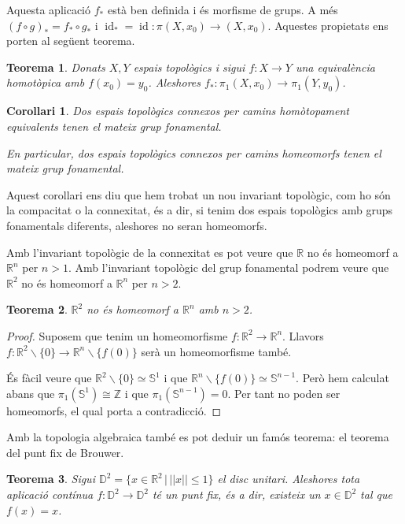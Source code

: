 \documentclass{article}
\newtheorem{teorema}{Teorema}
\newtheorem{corollari}{Corol\textperiodcentered lari}
\theoremstyle{definition}
\DeclareMathOperator{\id}{id}
\begin{document}
Aquesta aplicaci\'{o} $f_*$ est\`{a} ben definida i \'{e}s morfisme de grups. A m\'{e}s $(f\circ g)_*=f_*\circ g_*$ i $\id_*=\id:\pi(X,x_0)\rightarrow(X,x_0)$. Aquestes propietats ens porten al seg\"{u}ent teorema.

\begin{teorema}
Donats $X,Y$ espais topol\`{o}gics i sigui $f:X\rightarrow Y$ una equival\`{e}ncia homot\`{o}pica amb $f(x_0)=y_0$. Aleshores $f_*:\pi_1(X,x_0)\rightarrow\pi_1(Y,y_0)$.
\end{teorema}

\begin{corollari}
Dos espais topol\`{o}gics connexos per camins hom\`{o}topament equivalents tenen el mateix grup fonamental.

En particular, dos espais topol\`{o}gics connexos per camins homeomorfs tenen el mateix grup fonamental.
\end{corollari}

Aquest corol\textperiodcentered lari ens diu que hem trobat un nou invariant topol\`{o}gic, com ho s\'{o}n la compacitat o la connexitat, \'{e}s a dir, si tenim dos espais topol\`{o}gics amb grups fonamentals diferents, aleshores no seran homeomorfs.

Amb l'invariant topol\`{o}gic de la connexitat es pot veure que $\mathbb{R}$ no \'{e}s homeomorf a $\mathbb{R}^n$ per $n>1$. Amb l'invariant topol\`{o}gic del grup fonamental podrem veure que $\mathbb{R}^2$ no \'{e}s homeomorf a $\mathbb{R}^n$ per $n>2$.

\begin{teorema}
$\mathbb{R}^2$ no \'{e}s homeomorf a $\mathbb{R}^n$ amb $n>2$.
\end{teorema}
\begin{proof}
Suposem que tenim un homeomorfisme $f:\mathbb{R}^2\rightarrow\mathbb{R}^n$. Llavors $f:\mathbb{R}^2\backslash\{0\}\rightarrow\mathbb{R}^n\backslash\{f(0)\}$ ser\`{a} un homeomorfisme tamb\'{e}.

\'{E}s f\`{a}cil veure que $\mathbb{R}^2\backslash\{0\}\simeq\mathbb{S}^1$ i que $\mathbb{R}^n\backslash\{f(0)\}\simeq\mathbb{S}^{n-1}$. Per\`{o} hem calculat abans que $\pi_1(\mathbb{S}^1)\cong\mathbb{Z}$ i que $\pi_1(\mathbb{S}^{n-1})=0$. Per tant no poden ser homeomorfs, el qual porta a contradicci\'{o}.
\end{proof}

Amb la topologia algebraica tamb\'{e} es pot deduir un fam\'{o}s teorema: el teorema del punt fix de Brouwer.

\begin{teorema}
Sigui $\mathbb{D}^2=\{x\in\mathbb{R}^2\,|\,||x||\leq1\}$ el disc unitari. Aleshores tota aplicaci\'{o} cont\'{i}nua $f:\mathbb{D}^2\rightarrow\mathbb{D}^2$ t\'{e} un punt fix, \'{e}s a dir, existeix un $x\in\mathbb{D}^2$ tal que $f(x)=x$.
\end{teorema}
\end{document}
